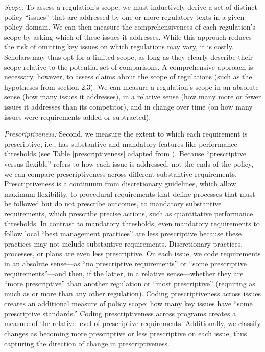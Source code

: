 \documentclass[
      12pt,
            Review ]{article}
\begin{document}


\emph{Scope:} To assess a regulation's scope, we must inductively derive
a set of distinct policy ``issues'' that are addressed by one or more
regulatory texts in a given policy domain. We can then measure the
comprehensiveness of each regulation's scope by asking which of these
issues it addresses. While this approach reduces the risk of omitting
key issues on which regulations may vary, it is costly. Scholars may
thus opt for a limited scope, as long as they clearly describe their
scope relative to the potential set of comparisons. A comprehensive
approach is necessary, however, to assess claims about the scope of
regulations (such as the hypotheses from section 2.3). We can measure a
regulation's scope in an absolute sense (how many issues it addresses),
in a relative sense (how many more or fewer issues it addresses than its
competitor), and in change over time (on how many issues were
requirements added or subtracted).

\emph{Prescriptiveness:} Second, we measure the extent to which each
requirement is prescriptive, i.e., has substantive and mandatory
features like performance thresholds (see Table \ref{prescriptiveness}
adapted from \citet{Cashore2007}). Because ``prescriptive versus
flexible'' refers to how each issue is addressed, not the ends of the
policy, we can compare prescriptiveness across different substantive
requirements. Prescriptiveness is a continuum from discretionary
guidelines, which allow maximum flexibility, to procedural requirements
that define processes that must be followed but do not prescribe
outcomes, to mandatory substantive requirements, which prescribe precise
actions, such as quantitative performance thresholds. In contrast to
mandatory thresholds, even mandatory requirements to follow local ``best
management practices'' are less prescriptive because these practices may
not include substantive requirements. Discretionary practices,
processes, or plans are even less prescriptive. On each issue, we code
requirements in an absolute sense---as ``no prescriptive requirements''
or ``some prescriptive requirements''---and then, if the latter, in a
relative sense---whether they are ``more prescriptive'' than another
regulation or ``most prescriptive'' (requiring as much as or more than
any other regulation). Coding prescriptiveness across issues creates an
additional measure of policy scope: how many key issues have ``some
prescriptive standards.'' Coding prescriptiveness across programs
creates a measure of the relative level of prescriptive requirements.
Additionally, we classify changes as becoming more prescriptive or less
prescriptive on each issue, thus capturing the direction of change in
prescriptiveness.
\end{document}
